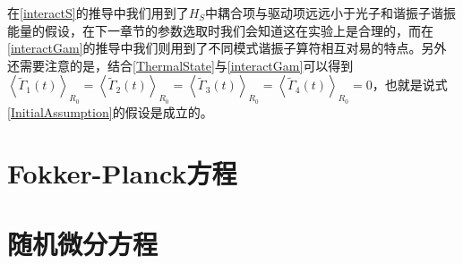 在\eqref{interactS}的推导中我们用到了$H_S$中耦合项与驱动项远远小于光子和谐振子谐振能量的假设，在下一章节的参数选取时我们会知道这在实验上是合理的，而在\eqref{interactGam}的推导中我们则用到了不同模式谐振子算符相互对易的特点。另外还需要注意的是，结合\eqref{ThermalState}与\eqref{interactGam}可以得到$\left\langle\tilde{\Gamma}_{1}(t)\right\rangle_{R_0}=\left\langle\tilde{\Gamma}_{2}(t)\right\rangle_{R_0}=\left\langle\tilde{\Gamma}_{3}(t)\right\rangle_{R_0}=\left\langle\tilde{\Gamma}_{4}(t)\right\rangle_{R_0}=0$，也就是说式\eqref{InitialAssumption}的假设是成立的。

\section{Fokker-Planck方程}


\section{随机微分方程}
